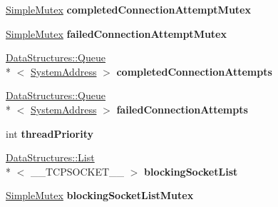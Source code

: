 \begin{DoxyCompactItemize}
\item 
\hypertarget{class_rak_net_1_1_t_c_p_interface_a31b37a61acde9b59a1b942d53cefc413}{\hyperlink{class_rak_net_1_1_simple_mutex}{Simple\-Mutex} {\bfseries completed\-Connection\-Attempt\-Mutex}}\label{class_rak_net_1_1_t_c_p_interface_a31b37a61acde9b59a1b942d53cefc413}

\item 
\hypertarget{class_rak_net_1_1_t_c_p_interface_ae3ddbe611071e0d88ea8eccf06a5346c}{\hyperlink{class_rak_net_1_1_simple_mutex}{Simple\-Mutex} {\bfseries failed\-Connection\-Attempt\-Mutex}}\label{class_rak_net_1_1_t_c_p_interface_ae3ddbe611071e0d88ea8eccf06a5346c}

\item 
\hypertarget{class_rak_net_1_1_t_c_p_interface_a6b96a5d86a20550b6abe1abb56c33ef9}{\hyperlink{class_data_structures_1_1_queue}{Data\-Structures\-::\-Queue}\\*
$<$ \hyperlink{struct_rak_net_1_1_system_address}{System\-Address} $>$ {\bfseries completed\-Connection\-Attempts}}\label{class_rak_net_1_1_t_c_p_interface_a6b96a5d86a20550b6abe1abb56c33ef9}

\item 
\hypertarget{class_rak_net_1_1_t_c_p_interface_abee9afc368bf3fb49bd25df429cc88d0}{\hyperlink{class_data_structures_1_1_queue}{Data\-Structures\-::\-Queue}\\*
$<$ \hyperlink{struct_rak_net_1_1_system_address}{System\-Address} $>$ {\bfseries failed\-Connection\-Attempts}}\label{class_rak_net_1_1_t_c_p_interface_abee9afc368bf3fb49bd25df429cc88d0}

\item 
\hypertarget{class_rak_net_1_1_t_c_p_interface_acefc971793844a57a26514ae9c26976c}{int {\bfseries thread\-Priority}}\label{class_rak_net_1_1_t_c_p_interface_acefc971793844a57a26514ae9c26976c}

\item 
\hypertarget{class_rak_net_1_1_t_c_p_interface_a4c8a07db02f1aa01aacd5b53e41e462f}{\hyperlink{class_data_structures_1_1_list}{Data\-Structures\-::\-List}\\*
$<$ \-\_\-\-\_\-\-T\-C\-P\-S\-O\-C\-K\-E\-T\-\_\-\-\_\- $>$ {\bfseries blocking\-Socket\-List}}\label{class_rak_net_1_1_t_c_p_interface_a4c8a07db02f1aa01aacd5b53e41e462f}

\item 
\hypertarget{class_rak_net_1_1_t_c_p_interface_a6c68006a7a05a3211cfb73992b5f57bc}{\hyperlink{class_rak_net_1_1_simple_mutex}{Simple\-Mutex} {\bfseries blocking\-Socket\-List\-Mutex}}\label{class_rak_net_1_1_t_c_p_interface_a6c68006a7a05a3211cfb73992b5f57bc}

\end{DoxyCompactItemize}


